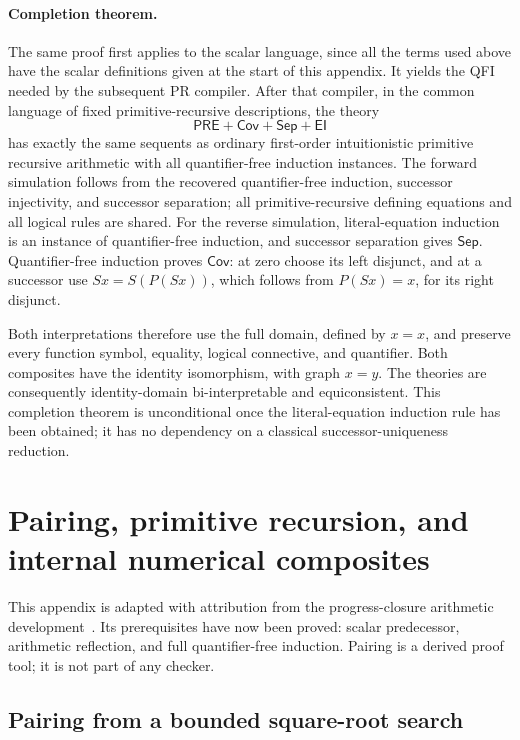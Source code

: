 \documentclass[11pt,letterpaper]{article}
\theoremstyle{definition}\newtheorem{definition}[theorem]{Definition}
\theoremstyle{remark}\newtheorem{remark}[theorem]{Remark}
\begin{document}
\paragraph{Completion theorem.}
The same proof first applies to the scalar language, since all the
terms used above have the scalar definitions given at the start of this
appendix. It yields the QFI needed by the subsequent PR compiler.
After that compiler, in the common language of fixed primitive-recursive
descriptions, the theory
\[
 \mathsf{PRE}+\mathsf{Cov}+\mathsf{Sep}+\mathsf{EI}
\]
has exactly the same sequents as ordinary first-order intuitionistic
primitive recursive arithmetic with all quantifier-free induction
instances.  The forward simulation follows from the recovered
quantifier-free induction, successor injectivity, and successor separation;
all primitive-recursive defining equations and all logical rules are
shared.  For the reverse simulation, literal-equation induction is an
instance of quantifier-free induction, and successor separation gives
$\mathsf{Sep}$.  Quantifier-free induction proves $\mathsf{Cov}$:
at zero choose its left disjunct, and at a successor use
$Sx=S(P(Sx))$, which follows from $P(Sx)=x$, for its right disjunct.

Both interpretations therefore use the full domain, defined by $x=x$,
and preserve every function symbol, equality, logical connective, and
quantifier.  Both composites have the identity isomorphism, with graph
$x=y$.  The theories are consequently identity-domain bi-interpretable
and equiconsistent.  This completion theorem is unconditional once the
literal-equation induction rule has been obtained; it has no dependency
on a classical successor-uniqueness reduction.

\section{Pairing, primitive recursion, and internal numerical composites}
\label{sec:iterator-coding}
This appendix is adapted with attribution from the progress-closure
arithmetic development~\cite{progress}. Its prerequisites have now been
proved: scalar predecessor, arithmetic reflection, and full quantifier-free
induction. Pairing is a derived proof tool; it is not part of any checker.

\subsection{Pairing from a bounded square-root search}
\end{document}
